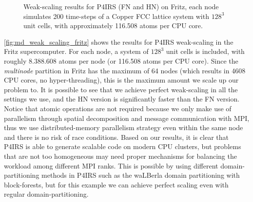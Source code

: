 \documentclass[Afour,sageh,times]{sagej}
\begin{document}
\begin{figure}[t]
\centering
{}
\vspace{-2ex}
\caption{Weak-scaling results for P4IRS (FN and HN) on Fritz, each node simulates 200 time-steps of a Copper FCC lattice system with $128^3$ unit cells, with approximately 116.508 atoms per CPU core.}
\vspace{-2ex}
\label{fig:md_weak_scaling_fritz}
\end{figure}

\autoref{fig:md_weak_scaling_fritz} shows the results for P4IRS weak-scaling in the Fritz supercomputer.
For each node, a system of $128^3$ unit cells is included, with roughly 8.388.608 atoms per node (or 116.508 atoms per CPU core).
Since the \emph{multinode} partition in Fritz has the maximum of 64 nodes (which results in 4608 CPU cores, no hyper-threading), this is the maximum amount we scale up our problem to.
It is possible to see that we achieve perfect weak-scaling in all the settings we use, and the \ac{HN} version is significantly faster than the \ac{FN} version.
Notice that atomic operations are not required because we only make use of parallelism through spatial decomposition and message communication with MPI, thus we use distributed-memory parallelism strategy even within the same node and there is no risk of race conditions.
Based on our results, it is clear that P4IRS is able to generate scalable code on modern CPU clusters, but problems that are not too homogeneous may need proper mechanisms for balancing the workload among different MPI ranks.
This is possible by using different domain-partitioning methods in P4IRS such as the waLBerla domain partitioning with block-forests, but for this example we can achieve perfect scaling even with regular domain-partitioning.
\end{document}
